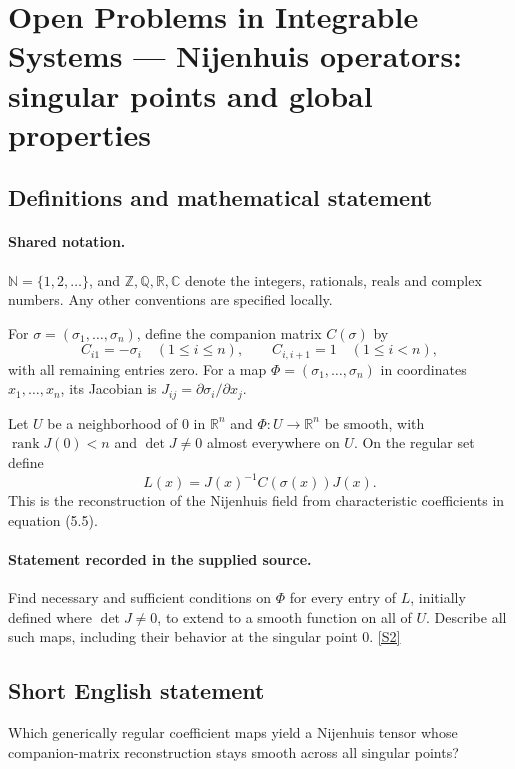 \documentclass[11pt]{article}
\newcommand{\sref}[2]{\hyperlink{source:#1:#2}{[S#2]}}
\begin{document}
\section{Open Problems in Integrable Systems — Nijenhuis operators: singular points and global properties}\label{statement}

\subsection{Definitions and mathematical statement}

\paragraph{Shared notation.}$\mathbb N=\{1,2,\ldots\}$, and $\mathbb Z,\mathbb Q,\mathbb R,\mathbb C$ denote the integers, rationals, reals and complex numbers. Any other conventions are specified locally.


For $\sigma=(\sigma_1,\ldots,\sigma_n)$, define the companion matrix $C(\sigma)$ by
\[ C_{i1}=-\sigma_i\quad(1\leq i\leq n),\qquad C_{i,i+1}=1\quad(1\leq i<n), \]
with all remaining entries zero. For a map $\Phi=(\sigma_1,\ldots,\sigma_n)$ in coordinates $x_1,\ldots,x_n$, its Jacobian is $J_{ij}=\partial\sigma_i/\partial x_j$.\par Let $U$ be a neighborhood of $0$ in $\mathbb R^n$ and $\Phi:U\to\mathbb R^n$ be smooth, with $\operatorname{rank}J(0)<n$ and $\det J\neq0$ almost everywhere on $U$. On the regular set define
\[ L(x)=J(x)^{-1}C(\sigma(x))J(x). \]
This is the reconstruction of the Nijenhuis field from characteristic coefficients in equation (5.5).
\paragraph{Statement recorded in the supplied source.}
Find necessary and sufficient conditions on $\Phi$ for every entry of $L$, initially defined where $\det J\neq0$, to extend to a smooth function on all of $U$. Describe all such maps, including their behavior at the singular point $0$. \sref{statement}{2}
\subsection{Short English statement}
Which generically regular coefficient maps yield a Nijenhuis tensor whose companion-matrix reconstruction stays smooth across all singular points?
\end{document}
